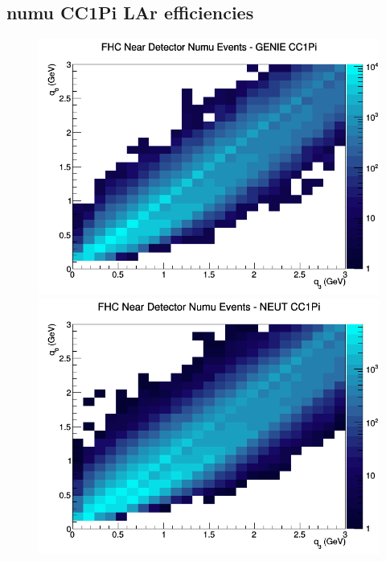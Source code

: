 \subsection{numu CC1Pi LAr efficiencies}
\begin{figure}[h]
\includegraphics[width=\linewidth]{eff_q0_q3/LAr/CC1Pi_FHC_ND_numu_q3_q0_GENIE.png}
\endminipage
{}
\includegraphics[width=\linewidth]{eff_q0_q3/LAr/CC1Pi_FHC_ND_numu_q3_q0_NEUT.png}
\endminipage
{}

\end{figure}

